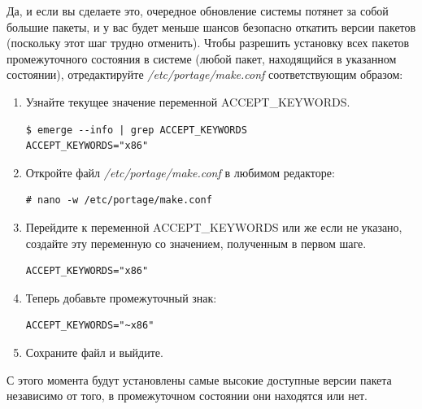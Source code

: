 \documentclass[10pt]{book}
\begin{document}
Да, и если вы сделаете это, очередное обновление системы потянет за собой большие пакеты, и у вас будет меньше шансов безопасно откатить версии пакетов (поскольку этот шаг трудно отменить).
Чтобы разрешить установку всех пакетов промежуточного состояния в системе (любой пакет, находящийся в указанном состоянии), отредактируйте \textit{/etc/portage/make.conf} соответствующим образом:
\begin{enumerate}
 \item Узнайте текущее значение переменной ACCEPT\_KEYWORDS.
 \begin{tcolorbox}
\begin{lstlisting}
$ emerge --info | grep ACCEPT_KEYWORDS
ACCEPT_KEYWORDS="x86"
\end{lstlisting}
\end{tcolorbox}
\item Откройте файл \textit{/etc/portage/make.conf} в любимом редакторе:
 \begin{tcolorbox}
\begin{lstlisting}
# nano -w /etc/portage/make.conf
\end{lstlisting}
\end{tcolorbox}
\item Перейдите к переменной ACCEPT\_KEYWORDS или же если не указано, создайте эту переменную со значением, полученным в первом шаге.
 \begin{tcolorbox}
\begin{lstlisting}
ACCEPT_KEYWORDS="x86"
\end{lstlisting}
\end{tcolorbox}
\item Теперь добавьте промежуточный знак:
 \begin{tcolorbox}
\begin{lstlisting}
ACCEPT_KEYWORDS="~x86"
\end{lstlisting}
\end{tcolorbox}
\item Сохраните файл и выйдите.
\end{enumerate}
С этого момента будут установлены самые высокие доступные версии пакета независимо от того, в промежуточном состоянии они находятся или нет.
\end{document}

